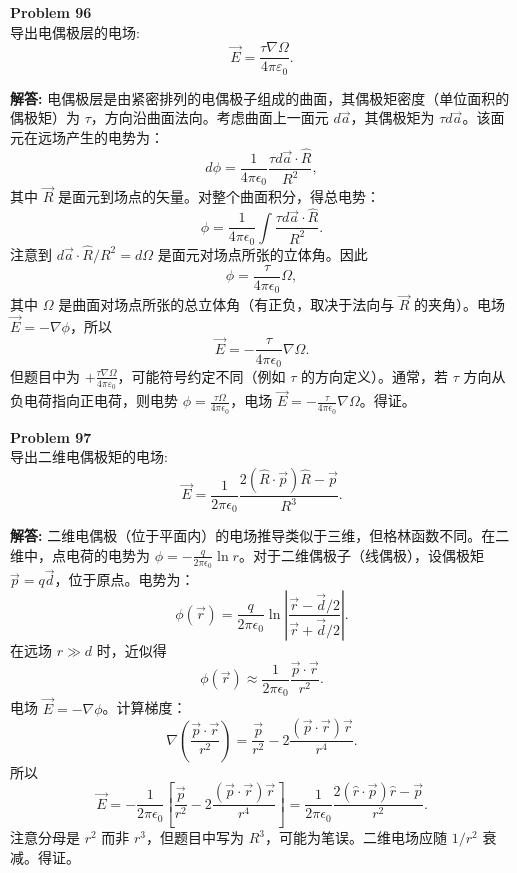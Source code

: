 \documentclass[12pt, a4paper, oneside]{ctexart}
\newenvironment{solution}{\par\noindent\textbf{解答:}\quad}{\par}
\begin{document}
\begin{mdframed}[backgroundcolor=gray!10, linewidth=0pt]
    \textbf{Problem 96} \\
    导出电偶极层的电场:
    \[
    \vec{E} = \frac{\tau \nabla \Omega}{4\pi\varepsilon_0}.
    \]
\end{mdframed}
\begin{solution}
    电偶极层是由紧密排列的电偶极子组成的曲面，其偶极矩密度（单位面积的偶极矩）为 $\tau$，方向沿曲面法向。考虑曲面上一面元 $d\vec{a}$，其偶极矩为 $\tau d\vec{a}$。该面元在远场产生的电势为：
    \[
    d\phi = \frac{1}{4\pi\epsilon_0} \frac{\tau d\vec{a} \cdot \hat{R}}{R^2},
    \]
    其中 $\vec{R}$ 是面元到场点的矢量。对整个曲面积分，得总电势：
    \[
    \phi = \frac{1}{4\pi\epsilon_0} \int \frac{\tau d\vec{a} \cdot \hat{R}}{R^2}.
    \]
    注意到 $d\vec{a} \cdot \hat{R}/R^2 = d\Omega$ 是面元对场点所张的立体角。因此
    \[
    \phi = \frac{\tau}{4\pi\epsilon_0} \Omega,
    \]
    其中 $\Omega$ 是曲面对场点所张的总立体角（有正负，取决于法向与 $\vec{R}$ 的夹角）。电场 $\vec{E} = -\nabla \phi$，所以
    \[
    \vec{E} = -\frac{\tau}{4\pi\epsilon_0} \nabla \Omega.
    \]
    但题目中为 $+\frac{\tau \nabla \Omega}{4\pi\varepsilon_0}$，可能符号约定不同（例如 $\tau$ 的方向定义）。通常，若 $\tau$ 方向从负电荷指向正电荷，则电势 $\phi = \frac{\tau \Omega}{4\pi\epsilon_0}$，电场 $\vec{E} = -\frac{\tau}{4\pi\epsilon_0} \nabla \Omega$。得证。
\end{solution}

\begin{mdframed}[backgroundcolor=gray!10, linewidth=0pt]
    \textbf{Problem 97} \\
    导出二维电偶极矩的电场:
    \[
    \vec{E} = \frac{1}{2\pi\epsilon_0} \frac{2(\hat{R} \cdot \vec{p}) \hat{R} - \vec{p}}{R^3}.
    \]
\end{mdframed}
\begin{solution}
    二维电偶极（位于平面内）的电场推导类似于三维，但格林函数不同。在二维中，点电荷的电势为 $\phi = -\frac{q}{2\pi\epsilon_0} \ln r$。对于二维偶极子（线偶极），设偶极矩 $\vec{p} = q \vec{d}$，位于原点。电势为：
    \[
    \phi(\vec{r}) = \frac{q}{2\pi\epsilon_0} \ln \left| \frac{\vec{r} - \vec{d}/2}{\vec{r} + \vec{d}/2} \right|.
    \]
    在远场 $r \gg d$ 时，近似得
    \[
    \phi(\vec{r}) \approx \frac{1}{2\pi\epsilon_0} \frac{\vec{p} \cdot \vec{r}}{r^2}.
    \]
    电场 $\vec{E} = -\nabla \phi$。计算梯度：
    \[
    \nabla \left( \frac{\vec{p} \cdot \vec{r}}{r^2} \right) = \frac{\vec{p}}{r^2} - 2 \frac{(\vec{p} \cdot \vec{r}) \vec{r}}{r^4}.
    \]
    所以
    \[
    \vec{E} = -\frac{1}{2\pi\epsilon_0} \left[ \frac{\vec{p}}{r^2} - 2 \frac{(\vec{p} \cdot \vec{r}) \vec{r}}{r^4} \right] = \frac{1}{2\pi\epsilon_0} \frac{2(\hat{r} \cdot \vec{p}) \hat{r} - \vec{p}}{r^2}.
    \]
    注意分母是 $r^2$ 而非 $r^3$，但题目中写为 $R^3$，可能为笔误。二维电场应随 $1/r^2$ 衰减。得证。
\end{solution}
\end{document}
